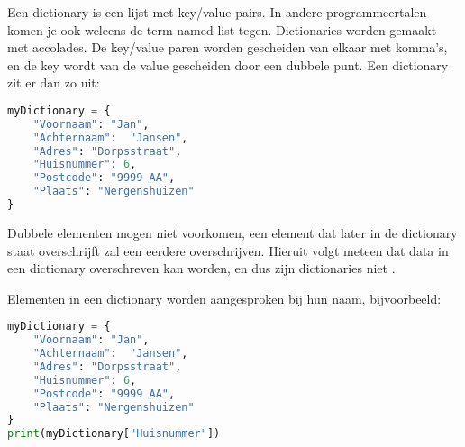 Een dictionary is een lijst met key/value pairs. In andere programmeertalen komen je ook weleens de term named list tegen. Dictionaries worden gemaakt met accolades. De key/value paren worden gescheiden van elkaar met komma's, en de key wordt van de value gescheiden door een dubbele punt. Een dictionary zit er dan zo uit:
\begin{lstlisting}[language=python]
myDictionary = {
	"Voornaam": "Jan",
	"Achternaam":  "Jansen",
	"Adres": "Dorpsstraat",
	"Huisnummer": 6,
	"Postcode": "9999 AA",
	"Plaats": "Nergenshuizen"
}
\end{lstlisting}
Dubbele elementen mogen niet voorkomen, een element dat later in de dictionary staat overschrijft zal een eerdere overschrijven. Hieruit volgt meteen dat data in een dictionary overschreven kan worden, en dus zijn dictionaries niet .

Elementen in een dictionary worden aangesproken bij hun naam, bijvoorbeeld:
\begin{lstlisting}[language=python]
myDictionary = {
	"Voornaam": "Jan",
	"Achternaam":  "Jansen",
	"Adres": "Dorpsstraat",
	"Huisnummer": 6,
	"Postcode": "9999 AA",
	"Plaats": "Nergenshuizen"
}
print(myDictionary["Huisnummer"])
\end{lstlisting}

